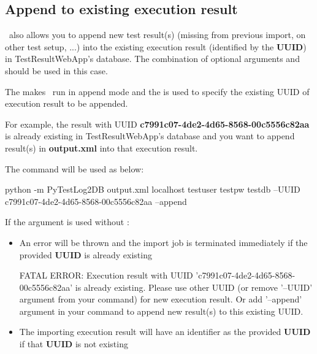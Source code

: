   \hypertarget{append-to-existing-execution-result}{%
  \subsection{Append to existing execution result}
  \label{append-to-existing-execution-result}}
    \pkg\ also allows you to append new test result(s) (missing from previous
    import, on other test setup, ...) into the existing execution result
    (identified by the \textbf{UUID}) in TestResultWebApp's database.
    The combination of optional arguments  and
     should be used in this case.

    The  makes \pkg\ run in append mode and the 
    is used to specify the existing UUID of execution result to be appended.

    For example, the result with UUID \textbf{c7991c07-4de2-4d65-8568-00c5556c82aa}
    is already existing in TestResultWebApp's database and you want to append
    result(s) in \textbf{output.xml} into that execution result.

    The command will be used as below:
\begin{robotlog}
python -m PyTestLog2DB output.xml localhost testuser testpw testdb --UUID c7991c07-4de2-4d65-8568-00c5556c82aa --append
\end{robotlog}

    If the argument  is used without :
    \begin{itemize}
      \item An error will be thrown and the import job is terminated immediately
            if the provided \textbf{UUID} is already existing

\begin{robotlog}
FATAL ERROR: Execution result with UUID 'c7991c07-4de2-4d65-8568-00c5556c82aa' is already existing.
             Please use other UUID (or remove '--UUID' argument from your command) for new execution result.
             Or add '--append' argument in your command to append new result(s) to this existing UUID.
\end{robotlog}
      \item The importing execution result will have an identifier as the
            provided \textbf{UUID} if that \textbf{UUID} is not existing
    \end{itemize}

